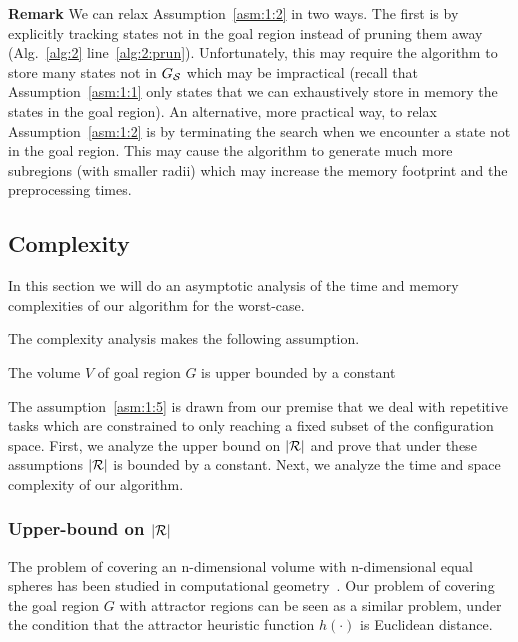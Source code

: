 \documentclass[a4paper]{report}
\begin{document}
\textbf{Remark}
We can relax Assumption~\ref{asm:1:2} in two ways.
The first is by explicitly tracking states not in the goal region instead of pruning them away (Alg.~\ref{alg:2} line~\ref{alg:2:prun}).
Unfortunately, this may require the algorithm to store many states not in $G_\mathcal{S}$ which may be impractical (recall that Assumption~\ref{asm:1:1} only states that we can exhaustively store in memory the states in the goal region).
An alternative, more practical way, to relax Assumption~\ref{asm:1:2} is by terminating the search when we encounter a state not in the goal region.
This may cause the algorithm to generate much more subregions (with smaller radii) which may increase the memory footprint and the preprocessing times.


\subsection{Complexity}
In this section we will do an asymptotic analysis of the time and memory complexities of our algorithm for the worst-case.

The complexity analysis makes the following assumption.
\vspace{2mm}\begin{assumption}
\label{asm:1:5} The volume $V$ of goal region $G$ is upper bounded by a constant
\end{assumption}

The assumption~\ref{asm:1:5} is drawn from our premise that we deal with repetitive tasks which are constrained to only reaching a fixed subset of the configuration space. First, we analyze the upper bound on $|\mathcal{R}|$ and prove that under these assumptions $|\mathcal{R}|$ is bounded by a constant. Next, we analyze the time and space complexity of our algorithm.

\subsubsection{Upper-bound on $|\mathcal{R}|$}
The problem of covering an n-dimensional volume with n-dimensional equal spheres has been studied in computational geometry~\cite{cover_spheres1, cover_spheres2}.
Our problem of covering the goal region $G$ with attractor regions can be seen as a similar problem, under the condition that the attractor heuristic function $h(\cdot)$ is Euclidean distance.
\end{document}
